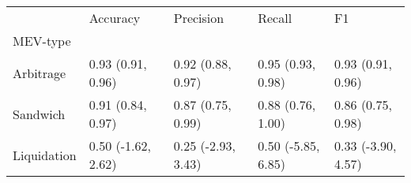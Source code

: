 \begin{tabular}{lllll}
\toprule
{} &            Accuracy &           Precision &              Recall &                  F1 \\
MEV-type    &                     &                     &                     &                     \\
\midrule
Arbitrage   &   0.93 (0.91, 0.96) &   0.92 (0.88, 0.97) &   0.95 (0.93, 0.98) &   0.93 (0.91, 0.96) \\
Sandwich    &   0.91 (0.84, 0.97) &   0.87 (0.75, 0.99) &   0.88 (0.76, 1.00) &   0.86 (0.75, 0.98) \\
Liquidation &  0.50 (-1.62, 2.62) &  0.25 (-2.93, 3.43) &  0.50 (-5.85, 6.85) &  0.33 (-3.90, 4.57) \\
\bottomrule
\end{tabular}
